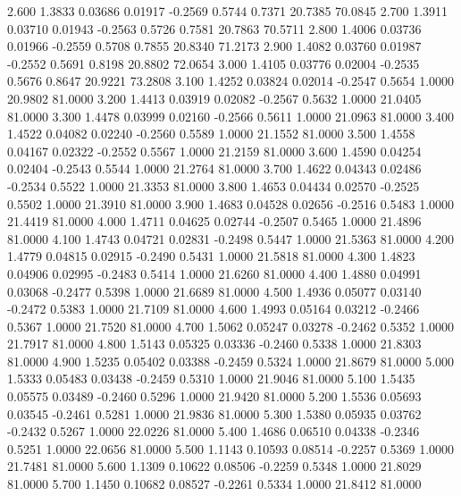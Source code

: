    2.600   1.3833   0.03686   0.01917  -0.2569   0.5744   0.7371  20.7385  70.0845
   2.700   1.3911   0.03710   0.01943  -0.2563   0.5726   0.7581  20.7863  70.5711
   2.800   1.4006   0.03736   0.01966  -0.2559   0.5708   0.7855  20.8340  71.2173
   2.900   1.4082   0.03760   0.01987  -0.2552   0.5691   0.8198  20.8802  72.0654
   3.000   1.4105   0.03776   0.02004  -0.2535   0.5676   0.8647  20.9221  73.2808
   3.100   1.4252   0.03824   0.02014  -0.2547   0.5654   1.0000  20.9802  81.0000
   3.200   1.4413   0.03919   0.02082  -0.2567   0.5632   1.0000  21.0405  81.0000
   3.300   1.4478   0.03999   0.02160  -0.2566   0.5611   1.0000  21.0963  81.0000
   3.400   1.4522   0.04082   0.02240  -0.2560   0.5589   1.0000  21.1552  81.0000
   3.500   1.4558   0.04167   0.02322  -0.2552   0.5567   1.0000  21.2159  81.0000
   3.600   1.4590   0.04254   0.02404  -0.2543   0.5544   1.0000  21.2764  81.0000
   3.700   1.4622   0.04343   0.02486  -0.2534   0.5522   1.0000  21.3353  81.0000
   3.800   1.4653   0.04434   0.02570  -0.2525   0.5502   1.0000  21.3910  81.0000
   3.900   1.4683   0.04528   0.02656  -0.2516   0.5483   1.0000  21.4419  81.0000
   4.000   1.4711   0.04625   0.02744  -0.2507   0.5465   1.0000  21.4896  81.0000
   4.100   1.4743   0.04721   0.02831  -0.2498   0.5447   1.0000  21.5363  81.0000
   4.200   1.4779   0.04815   0.02915  -0.2490   0.5431   1.0000  21.5818  81.0000
   4.300   1.4823   0.04906   0.02995  -0.2483   0.5414   1.0000  21.6260  81.0000
   4.400   1.4880   0.04991   0.03068  -0.2477   0.5398   1.0000  21.6689  81.0000
   4.500   1.4936   0.05077   0.03140  -0.2472   0.5383   1.0000  21.7109  81.0000
   4.600   1.4993   0.05164   0.03212  -0.2466   0.5367   1.0000  21.7520  81.0000
   4.700   1.5062   0.05247   0.03278  -0.2462   0.5352   1.0000  21.7917  81.0000
   4.800   1.5143   0.05325   0.03336  -0.2460   0.5338   1.0000  21.8303  81.0000
   4.900   1.5235   0.05402   0.03388  -0.2459   0.5324   1.0000  21.8679  81.0000
   5.000   1.5333   0.05483   0.03438  -0.2459   0.5310   1.0000  21.9046  81.0000
   5.100   1.5435   0.05575   0.03489  -0.2460   0.5296   1.0000  21.9420  81.0000
   5.200   1.5536   0.05693   0.03545  -0.2461   0.5281   1.0000  21.9836  81.0000
   5.300   1.5380   0.05935   0.03762  -0.2432   0.5267   1.0000  22.0226  81.0000
   5.400   1.4686   0.06510   0.04338  -0.2346   0.5251   1.0000  22.0656  81.0000
   5.500   1.1143   0.10593   0.08514  -0.2257   0.5369   1.0000  21.7481  81.0000
   5.600   1.1309   0.10622   0.08506  -0.2259   0.5348   1.0000  21.8029  81.0000
   5.700   1.1450   0.10682   0.08527  -0.2261   0.5334   1.0000  21.8412  81.0000
